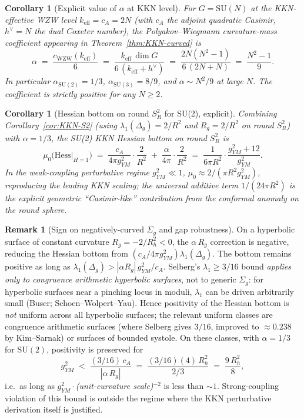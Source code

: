 \documentclass[11pt,letterpaper]{article}
\newtheorem{corollary}[theorem]{Corollary}
\theoremstyle{definition}
\newtheorem{remark}[theorem]{Remark}
\begin{document}
\begin{corollary}[Explicit value of $\alpha$ at KKN level]\label{cor:alpha-explicit}
For $G = \mathrm{SU}(N)$ at the KKN-effective WZW level $k_{\mathrm{eff}} = c_A = 2N$ (with $c_A$ the adjoint quadratic Casimir, $h^\vee = N$ the dual Coxeter number), the Polyakov--Wiegmann curvature-mass coefficient appearing in Theorem~\ref{thm:KKN-curved} is
\begin{equation}\label{eq:alpha-formula}
\alpha \;=\; \frac{c_{\mathrm{WZW}}(k_{\mathrm{eff}})}{6} \;=\; \frac{k_{\mathrm{eff}}\,\dim G}{6\,(k_{\mathrm{eff}} + h^\vee)} \;=\; \frac{2N(N^2-1)}{6\,(2N+N)} \;=\; \frac{N^2-1}{9}.
\end{equation}
In particular $\alpha_{\mathrm{SU}(2)} = 1/3$, $\alpha_{\mathrm{SU}(3)} = 8/9$, and $\alpha \sim N^2/9$ at large $N$. The coefficient is strictly positive for any $N \ge 2$.
\end{corollary}

\begin{corollary}[Hessian bottom on round $S^2_R$ for SU(2), explicit]\label{cor:S2-explicit}
Combining Corollary~\ref{cor:KKN-S2} (using $\lambda_1(\Delta_g) = 2/R^2$ and $R_g = 2/R^2$ on round $S^2_R$) with $\alpha = 1/3$, the SU(2) KKN Hessian bottom on round $S^2_R$ is
\[
\mu_0\bigl(\mathrm{Hess}|_{H=1}\bigr) \;=\; \frac{c_A}{4\pi g^2_{YM}}\cdot\frac{2}{R^2} \;+\; \frac{\alpha}{4\pi}\cdot\frac{2}{R^2}
\;=\; \frac{1}{6\pi R^2}\cdot\frac{g^2_{YM} + 12}{g^2_{YM}}.
\]
In the weak-coupling perturbative regime $g^2_{YM} \ll 1$, $\mu_0 \approx 2/(\pi R^2 g^2_{YM})$, reproducing the leading KKN scaling; the universal additive term $1/(24\pi R^2)$ is the explicit geometric ``Casimir-like'' contribution from the conformal anomaly on the round sphere.
\end{corollary}

\begin{remark}[Sign on negatively-curved $\Sigma_g$ and gap robustness]\label{rmk:negcurv}
On a hyperbolic surface of constant curvature $R_g = -2/R_h^2 < 0$, the $\alpha\,R_g$ correction is negative, reducing the Hessian bottom from $(c_A/4\pi g^2_{YM})\lambda_1(\Delta_g)$. The bottom remains positive as long as $\lambda_1(\Delta_g) > |\alpha R_g|\,g^2_{YM}/c_A$. Selberg's $\lambda_1 \ge 3/16$ bound \emph{applies only to congruence arithmetic hyperbolic surfaces}, not to generic $\Sigma_g$: for hyperbolic surfaces near a pinching locus in moduli, $\lambda_1$ can be driven arbitrarily small (Buser; Schoen--Wolpert--Yau). Hence positivity of the Hessian bottom is \emph{not} uniform across all hyperbolic surfaces; the relevant uniform classes are congruence arithmetic surfaces (where Selberg gives $3/16$, improved to $\approx 0.238$ by Kim--Sarnak) or surfaces of bounded systole. On these classes, with $\alpha = 1/3$ for $\mathrm{SU}(2)$, positivity is preserved for
\[
g^2_{YM} \;<\; \frac{(3/16)\,c_A}{|\alpha\,R_g|} \;=\; \frac{(3/16)(4)\,R_h^2}{2/3} \;=\; \frac{9\,R_h^2}{8},
\]
i.e.\ as long as $g^2_{YM} \cdot$\textit{(unit-curvature scale)}${}^{-2}$ is less than $\sim 1$. Strong-coupling violation of this bound is outside the regime where the KKN perturbative derivation itself is justified.
\end{remark}
\end{document}
